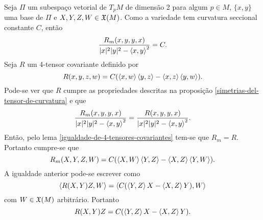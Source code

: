 \begin{demonstracao}
	Seja $\Pi$ um subespaço vetorial de $T_p M$ de dimensão 2 para algum $p \in M$, $\{x,y\}$ uma base de $\Pi$ e $X,Y,Z,W \in \mathfrak{X}(M)$. Como a variedade tem curvatura seccional constante $C$, então
	\begin{equation*}
	\frac{R_m(x,y,y,x)}{|x|^2 |y|^2 - \left\langle x,y \right\rangle^2} = C.
	\end{equation*}
	Seja $R$ um 4-tensor covariante definido por
	\begin{equation*}
	R(x,y,z,w) = C (\left\langle x,w \right\rangle \left\langle y,z \right\rangle - \left\langle x,z \right\rangle \left\langle y,w \right\rangle).
	\end{equation*}
	Pode-se ver que $R$ cumpre as propriedades descritas na proposição \ref{simetrias-del-tensor-de-curvatura} e que
	\begin{equation*}
	\frac{R_m(x,y,y,x)}{|x|^2 |y|^2 - \left\langle x,y \right\rangle^2} = \frac{R(x,y,y,x)}{|x|^2 |y|^2 - \left\langle x,y \right\rangle^2}.
	\end{equation*}
	Então, pelo lema \ref{igualdade-de-4-tensores-covariantes} tem-se que $R_m = R$. Portanto cumpre-se que
	\begin{equation*}
	R_m(X,Y,Z,W) = C(\left\langle X,W \right\rangle \left\langle Y,Z \right\rangle - \left\langle X,Z \right\rangle \left\langle Y,W \right\rangle).
	\end{equation*}
	A igualdade anterior pode-se escrever como
	\begin{equation*}
	\left\langle R(X,Y)Z,W \right\rangle =  \left\langle C(\left\langle Y,Z \right\rangle X - \left\langle X,Z \right\rangle Y),W \right\rangle
	\end{equation*}
	com $W \in \mathfrak{X}(M)$ arbitrário. Portanto
	\begin{equation*}
	R(X,Y)Z =  C(\left\langle Y,Z \right\rangle X - \left\langle X,Z \right\rangle Y).
	\end{equation*}
\end{demonstracao}